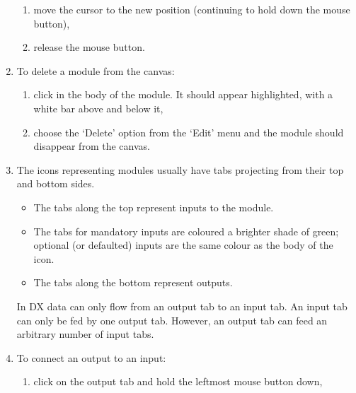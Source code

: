 \documentclass[twoside,11pt]{article}
\begin{document}
\begin{enumerate}
\begin{enumerate}
    \item move the cursor to the new position (continuing to hold down
     the mouse button),

    \item release the mouse button.

  \end{enumerate}

  \item To delete a module from the canvas:

  \begin{enumerate}

    \item click in the body of the module. It should appear highlighted,
     with a white bar above and below it,

    \item choose the `Delete' option from the `Edit' menu and the module
     should disappear from the canvas.

  \end{enumerate}

  \item The icons representing modules usually have tabs projecting
   from their top and bottom sides.

  \begin{itemize}

    \item The tabs along the top represent inputs to the module.

    \item The tabs for mandatory inputs are coloured a brighter shade
     of green; optional (or defaulted) inputs are the same colour as
     the body of the icon.

    \item The tabs along the bottom represent outputs.

  \end{itemize}

   In DX data can only flow from an output tab to an input tab. An
   input tab can only be fed by one output tab. However, an output tab
   can feed an arbitrary number of input tabs.

  \item To connect an output to an input:

  \begin{enumerate}

    \item click on the output tab and hold the leftmost mouse button
     down,


\end{enumerate}
\end{enumerate}
\end{document}
